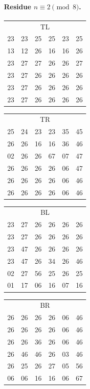 \paragraph{Residue $n\equiv 2\pmod 8$.}
\begin{center}\scriptsize\ttfamily
\begin{tabular}[t]{@{}c@{\,}c@{\,}c@{\,}c@{\,}c@{\,}c@{}}\multicolumn{6}{c}{\normalfont\scriptsize TL}\\
23 & 23 & 25 & 25 & 23 & 25\\
13 & 12 & 26 & 16 & 16 & 26\\
23 & 27 & 27 & 26 & 26 & 27\\
23 & 27 & 26 & 26 & 26 & 26\\
23 & 27 & 26 & 26 & 26 & 26\\
23 & 27 & 26 & 26 & 26 & 26\end{tabular}\qquad
\begin{tabular}[t]{@{}c@{\,}c@{\,}c@{\,}c@{\,}c@{\,}c@{}}\multicolumn{6}{c}{\normalfont\scriptsize TR}\\
25 & 24 & 23 & 23 & 35 & 45\\
26 & 26 & 16 & 16 & 36 & 46\\
02 & 26 & 26 & 67 & 07 & 47\\
26 & 26 & 26 & 26 & 06 & 47\\
26 & 26 & 26 & 26 & 06 & 46\\
26 & 26 & 26 & 26 & 06 & 46\end{tabular}\qquad
\begin{tabular}[t]{@{}c@{\,}c@{\,}c@{\,}c@{\,}c@{\,}c@{}}\multicolumn{6}{c}{\normalfont\scriptsize BL}\\
23 & 27 & 26 & 26 & 26 & 26\\
23 & 27 & 26 & 26 & 26 & 26\\
23 & 47 & 26 & 26 & 26 & 26\\
23 & 47 & 26 & 34 & 26 & 46\\
02 & 27 & 56 & 25 & 26 & 25\\
01 & 17 & 06 & 16 & 07 & 16\end{tabular}\qquad
\begin{tabular}[t]{@{}c@{\,}c@{\,}c@{\,}c@{\,}c@{\,}c@{}}\multicolumn{6}{c}{\normalfont\scriptsize BR}\\
26 & 26 & 26 & 26 & 06 & 46\\
26 & 26 & 26 & 26 & 06 & 46\\
26 & 26 & 36 & 26 & 06 & 46\\
26 & 46 & 46 & 26 & 03 & 46\\
26 & 25 & 26 & 27 & 05 & 56\\
06 & 06 & 16 & 16 & 06 & 67\end{tabular}
\end{center}

